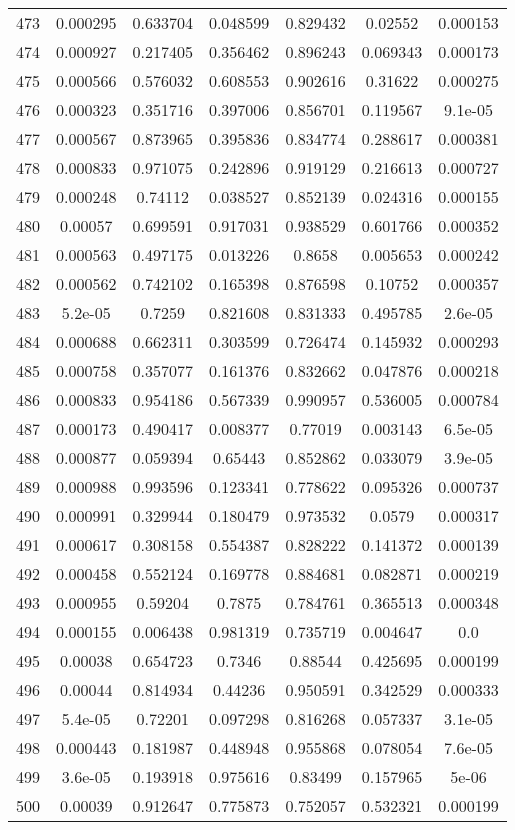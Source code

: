 \begin{table}
\begin{tabular}{c|c|c|c|c|c|c}
473 & 0.000295 & 0.633704 & 0.048599 & 0.829432 & 0.02552 & 0.000153\\
474 & 0.000927 & 0.217405 & 0.356462 & 0.896243 & 0.069343 & 0.000173\\
475 & 0.000566 & 0.576032 & 0.608553 & 0.902616 & 0.31622 & 0.000275\\
476 & 0.000323 & 0.351716 & 0.397006 & 0.856701 & 0.119567 & 9.1e-05\\
477 & 0.000567 & 0.873965 & 0.395836 & 0.834774 & 0.288617 & 0.000381\\
478 & 0.000833 & 0.971075 & 0.242896 & 0.919129 & 0.216613 & 0.000727\\
479 & 0.000248 & 0.74112 & 0.038527 & 0.852139 & 0.024316 & 0.000155\\
480 & 0.00057 & 0.699591 & 0.917031 & 0.938529 & 0.601766 & 0.000352\\
481 & 0.000563 & 0.497175 & 0.013226 & 0.8658 & 0.005653 & 0.000242\\
482 & 0.000562 & 0.742102 & 0.165398 & 0.876598 & 0.10752 & 0.000357\\
483 & 5.2e-05 & 0.7259 & 0.821608 & 0.831333 & 0.495785 & 2.6e-05\\
484 & 0.000688 & 0.662311 & 0.303599 & 0.726474 & 0.145932 & 0.000293\\
485 & 0.000758 & 0.357077 & 0.161376 & 0.832662 & 0.047876 & 0.000218\\
486 & 0.000833 & 0.954186 & 0.567339 & 0.990957 & 0.536005 & 0.000784\\
487 & 0.000173 & 0.490417 & 0.008377 & 0.77019 & 0.003143 & 6.5e-05\\
488 & 0.000877 & 0.059394 & 0.65443 & 0.852862 & 0.033079 & 3.9e-05\\
489 & 0.000988 & 0.993596 & 0.123341 & 0.778622 & 0.095326 & 0.000737\\
490 & 0.000991 & 0.329944 & 0.180479 & 0.973532 & 0.0579 & 0.000317\\
491 & 0.000617 & 0.308158 & 0.554387 & 0.828222 & 0.141372 & 0.000139\\
492 & 0.000458 & 0.552124 & 0.169778 & 0.884681 & 0.082871 & 0.000219\\
493 & 0.000955 & 0.59204 & 0.7875 & 0.784761 & 0.365513 & 0.000348\\
494 & 0.000155 & 0.006438 & 0.981319 & 0.735719 & 0.004647 & 0.0\\
495 & 0.00038 & 0.654723 & 0.7346 & 0.88544 & 0.425695 & 0.000199\\
496 & 0.00044 & 0.814934 & 0.44236 & 0.950591 & 0.342529 & 0.000333\\
497 & 5.4e-05 & 0.72201 & 0.097298 & 0.816268 & 0.057337 & 3.1e-05\\
498 & 0.000443 & 0.181987 & 0.448948 & 0.955868 & 0.078054 & 7.6e-05\\
499 & 3.6e-05 & 0.193918 & 0.975616 & 0.83499 & 0.157965 & 5e-06\\
500 & 0.00039 & 0.912647 & 0.775873 & 0.752057 & 0.532321 & 0.000199\\
\end{tabular}
\end{table}
